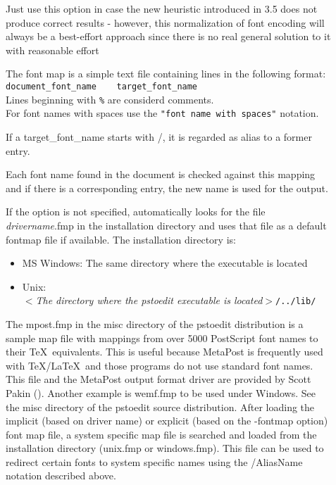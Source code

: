 \documentclass[english,a4paper]{article}
\begin{document}
\begin{description}
\item[]
Just use this option in case the new heuristic introduced in 3.5 does not produce correct results - however, this normalization of font encoding will always be a best-effort approach since there is no real general solution to it with reasonable effort


\item[]
The font map is a simple text file containing lines in the following format:\\


\verb+document_font_name    target_font_name+\\
Lines beginning with \verb+%+ are considerd comments.\\
For font names with spaces use the \verb+"font name with spaces"+ notation.

If a target\_font\_name starts with /, it is regarded as alias to a former entry.
 
Each font name found in the document is checked against this mapping and if there is a corresponding entry, the new name is used for the output. 

If  the  option is not specified,  automatically looks for the file \emph{drivername}.fmp in the installation directory and uses that file as a default fontmap file if available. The installation directory is:

\begin{itemize}

  \item MS Windows: The same directory where the  executable is located

  \item Unix:\\
  $<$\emph{The directory where the pstoedit executable is located}$>$\verb+/../lib/+

\end{itemize}

The mpost.fmp in the misc directory of the pstoedit distribution is a sample map file with mappings from over 5000 PostScript font names to their \TeX\ equivalents. This is useful because MetaPost is frequently used with \TeX/\LaTeX\ and those programs do not use standard font names. This file and the MetaPost output format driver are provided by Scott Pakin ().
Another example is wemf.fmp to be used under Windows. See the misc directory of the pstoedit source distribution.
After loading the implicit (based on driver name) or explicit (based on the -fontmap option) font map file, a system specific map file is searched and loaded from the installation directory (unix.fmp or windows.fmp). This file can be used to redirect certain fonts to system specific names using the /AliasName notation described above.


\end{description}
\end{document}
